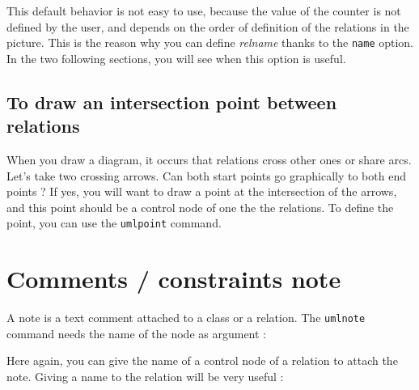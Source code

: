 \documentclass[a4paper,11pt]{report}
\newcommand{\inputTikZ}[1]{%
  }%
\newcommand{\inputTikZ}[1]{%
    \texttt{[image: fig/\#1.pdf]}%
  }%
\begin{document}
This default behavior is not easy to use, because the value of the counter is not defined by the user, and depends on the order of definition of the relations in the picture. This is the reason why you can define {\it relname} thanks to the {\tt name} option. In the two following sections, you will see when this option is useful.

\subsection{To draw an intersection point between relations}\label{ss.relpt}

When you draw a diagram, it occurs that relations cross other ones or share arcs. Let's take two crossing arrows.
Can both start points go graphically to both end points ? If yes, you will want to draw a point at the intersection of the arrows, and this point should be a control node of one the the relations. To define the point, you can use the {\tt umlpoint} command.

\medskip

\begin{minipage}{0.5\textwidth}

\end{minipage}
\begin{minipage}{0.4\textwidth}
\begin{center}
\inputTikZ{point}
\end{center}
\end{minipage}

\section{Comments / constraints note}\label{s.note}

A note is a text comment attached to a class or a relation. The {\tt umlnote} command needs the name of the node as argument :

\medskip

\begin{minipage}{0.5\textwidth}

\end{minipage}
\begin{minipage}{0.4\textwidth}
\begin{center}
\inputTikZ{noteclass}
\end{center}
\end{minipage}

\medskip

Here again, you can give the name of a control node of a relation to attach the note. Giving a name to the relation will be very useful :
\end{document}
